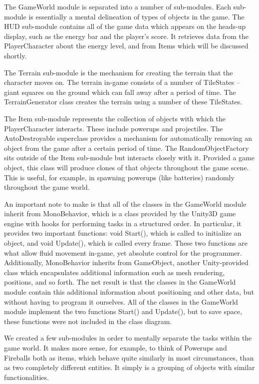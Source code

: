 \documentclass[10pt,letterpaper,oneside,english]{article}
\begin{document}
The GameWorld module is separated into a number of sub-modules. Each sub-module is essentially a mental delineation of types of objects in the game. The HUD sub-module contains all of the game data which appears on the heads-up display, such as the energy bar and the player’s score. It retrieves data from the PlayerCharacter about the energy level, and from Items which will be discussed shortly.

The Terrain sub-module is the mechanism for creating the terrain that the character moves on. The terrain in-game consists of a number of TileStates -- giant squares on the ground which can fall away after a period of time. The TerrainGenerator class creates the terrain using a number of these TileStates.

The Item sub-module represents the collection of objects with which the PlayerCharacter interacts. These include powerups and projectiles. The AutoDestroyable superclass provides a mechanism for automatically removing an object from the game after a certain period of time. The RandomObjectFactory sits outside of the Item sub-module but interacts closely with it. Provided a game object, this class will produce clones of that objects throughout the game scene. This is useful, for example, in spawning powerups (like batteries) randomly throughout the game world.

An important note to make is that all of the classes in the GameWorld module inherit from MonoBehavior, which is a class provided by the Unity3D game engine with hooks for performing tasks in a structured order. In particular, it provides two important functions: void Start(), which is called to initialize an object, and void Update(), which is called every frame. These two functions are what allow fluid movement in-game, yet absolute control for the programmer. Additionally, MonoBehavior inherits from GameObject, another Unity-provided class which encapsulates additional information such as mesh rendering, positions, and so forth. The net result is that the classes in the GameWorld module contain this additional information about positioning and other data, but without having to program it ourselves. All of the classes in the GameWorld module implement the two functions Start() and Update(), but to save space, these functions were not included in the class diagram.

We created a few sub-modules in order to mentally separate the tasks within the game world. It makes more sense, for example, to think of Powerups and Fireballs both as items, which behave quite similarly in most circumstances, than as two completely different entities. It simply is a grouping of objects with similar functionalities.
\end{document}
